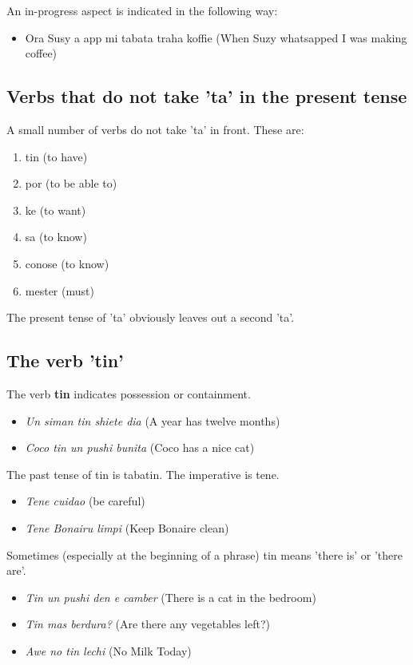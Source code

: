 An in-progress aspect is indicated in the following way:
\begin{itemize}
\item Ora Susy a app mi tabata traha koffie (When Suzy whatsapped I was
  making coffee)
\end{itemize}

\subsection{Verbs that do not take 'ta' in the present tense}
A small number of verbs do not take 'ta' in front. These are:
\begin{enumerate}
\item tin (to have)
\item por (to be able to)
\item ke (to want)
\item sa (to know)
\item conose (to know)
\item mester (must)
\end{enumerate}
The present tense of 'ta' obviously leaves out a second 'ta'.

\subsection{The verb 'tin'}
The verb \textbf{tin} indicates possession or containment.
 \begin{itemize}
\item \emph{Un siman tin shiete dia} (A year has twelve months)
 \item \emph{Coco tin un pushi bunita} (Coco has a nice cat)
 \end{itemize}
 
The past tense of tin is tabatin. The imperative is tene.
 
 \begin{itemize}
 \item \emph{Tene cuidao} (be careful)
 \item \emph{Tene Bonairu limpi} (Keep Bonaire clean)
 \end{itemize}

Sometimes (especially at the beginning of a phrase) tin means 'there
is' or 'there are'.
 
\begin{itemize}
\item \emph{Tin un pushi den e camber} (There is a cat in the bedroom) 
\item \emph{Tin mas berdura?} (Are there any vegetables left?)
\item \emph{Awe no tin lechi} (No Milk Today)
\end{itemize}

